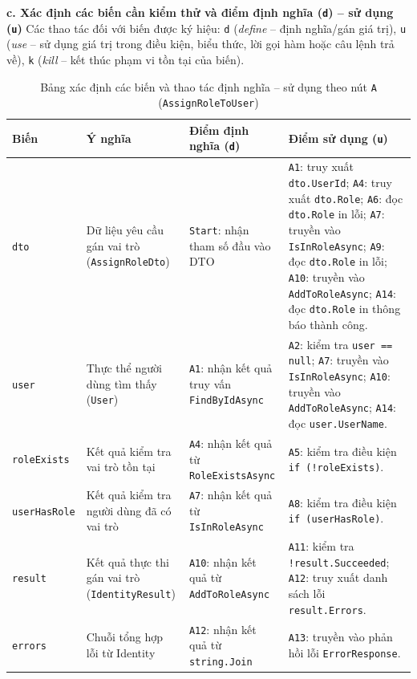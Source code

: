 \documentclass[11pt,a4paper]{article}
\begin{document}
\noindent\textbf{c. Xác định các biến cần kiểm thử và điểm định nghĩa (\texttt{d}) -- sử dụng (\texttt{u})}
Các thao tác đối với biến được ký hiệu: \texttt{d} (\textit{define} -- định nghĩa/gán giá trị), \texttt{u} (\textit{use} -- sử dụng giá trị trong điều kiện, biểu thức, lời gọi hàm hoặc câu lệnh trả về), \texttt{k} (\textit{kill} -- kết thúc phạm vi tồn tại của biến).

\begin{table}[H]
\centering
\scriptsize
\begin{tabularx}{\textwidth}{|L{1.8cm}|L{3.2cm}|L{3.5cm}|X|}
\hline
{}
\textbf{Biến} & \textbf{Ý nghĩa} & \textbf{Điểm định nghĩa (\texttt{d})} & \textbf{Điểm sử dụng (\texttt{u})} \tabularnewline
\hline
\texttt{dto} & Dữ liệu yêu cầu gán vai trò (\texttt{AssignRoleDto}) & \texttt{Start}: nhận tham số đầu vào DTO & \texttt{A1}: truy xuất \texttt{dto.UserId}; \texttt{A4}: truy xuất \texttt{dto.Role}; \texttt{A6}: đọc \texttt{dto.Role} in lỗi; \texttt{A7}: truyền vào \texttt{IsInRoleAsync}; \texttt{A9}: đọc \texttt{dto.Role} in lỗi; \texttt{A10}: truyền vào \texttt{AddToRoleAsync}; \texttt{A14}: đọc \texttt{dto.Role} in thông báo thành công. \\ \hline
\texttt{user} & Thực thể người dùng tìm thấy (\texttt{User}) & \texttt{A1}: nhận kết quả truy vấn \texttt{FindByIdAsync} & \texttt{A2}: kiểm tra \texttt{user == null}; \texttt{A7}: truyền vào \texttt{IsInRoleAsync}; \texttt{A10}: truyền vào \texttt{AddToRoleAsync}; \texttt{A14}: đọc \texttt{user.UserName}. \\ \hline
\texttt{roleExists} & Kết quả kiểm tra vai trò tồn tại & \texttt{A4}: nhận kết quả từ \texttt{RoleExistsAsync} & \texttt{A5}: kiểm tra điều kiện \texttt{if (!roleExists)}. \\ \hline
\texttt{userHasRole} & Kết quả kiểm tra người dùng đã có vai trò & \texttt{A7}: nhận kết quả từ \texttt{IsInRoleAsync} & \texttt{A8}: kiểm tra điều kiện \texttt{if (userHasRole)}. \\ \hline
\texttt{result} & Kết quả thực thi gán vai trò (\texttt{IdentityResult}) & \texttt{A10}: nhận kết quả từ \texttt{AddToRoleAsync} & \texttt{A11}: kiểm tra \texttt{!result.Succeeded}; \texttt{A12}: truy xuất danh sách lỗi \texttt{result.Errors}. \\ \hline
\texttt{errors} & Chuỗi tổng hợp lỗi từ Identity & \texttt{A12}: nhận kết quả từ \texttt{string.Join} & \texttt{A13}: truyền vào phản hồi lỗi \texttt{ErrorResponse}. \\ \hline
\end{tabularx}
\caption{Bảng xác định các biến và thao tác định nghĩa -- sử dụng theo nút \texttt{A} (\texttt{AssignRoleToUser})}
\end{table}
\end{document}
